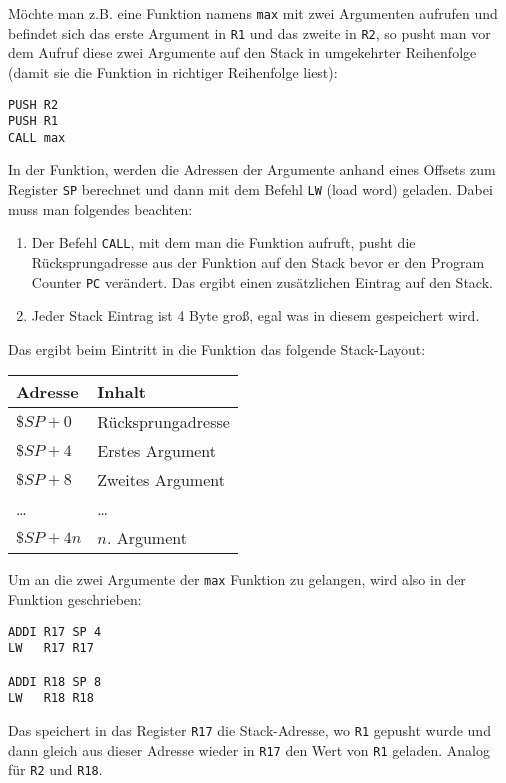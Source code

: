 Möchte man z.B. eine Funktion namens \texttt{max} mit zwei Argumenten aufrufen
und befindet sich das erste Argument in \texttt{R1} und das zweite in
\texttt{R2}, so pusht man vor dem Aufruf diese zwei Argumente auf den Stack in
umgekehrter Reihenfolge (damit sie die Funktion in richtiger Reihenfolge liest):
\begin{lstlisting}
PUSH R2
PUSH R1
CALL max
\end{lstlisting}
In der Funktion, werden die Adressen der Argumente anhand eines Offsets zum
Register \texttt{SP} berechnet und dann mit dem Befehl \texttt{LW} (load word)
geladen. Dabei muss man folgendes beachten:
\begin{enumerate}
 \item Der Befehl \texttt{CALL}, mit dem man die Funktion aufruft, pusht die
       Rücksprungadresse aus der Funktion auf den Stack bevor er den Program
       Counter \texttt{PC} verändert. Das ergibt einen zusätzlichen Eintrag 
       auf den Stack.
 \item Jeder Stack Eintrag ist 4 Byte groß, egal was in diesem gespeichert wird.
\end{enumerate}
Das ergibt beim Eintritt in die Funktion das folgende Stack-Layout:
\begin{center}
 \begin{tabular}{ll}
  Adresse     & Inhalt \\\hline
  $\$SP + 0$  & Rücksprungadresse \\
  $\$SP + 4$  & Erstes Argument   \\
  $\$SP + 8$  & Zweites Argument  \\
  \ldots      & \ldots            \\
  $\$SP + 4n$ & $n$. Argument
 \end{tabular}
\end{center}
Um an die zwei Argumente der \texttt{max} Funktion zu gelangen, wird also in der
Funktion geschrieben:
\begin{lstlisting}
ADDI R17 SP 4
LW   R17 R17

ADDI R18 SP 8
LW   R18 R18
\end{lstlisting}
Das speichert in das Register \texttt{R17} die Stack-Adresse, wo \texttt{R1}
gepusht wurde und dann gleich aus dieser Adresse wieder in \texttt{R17} den
Wert von \texttt{R1} geladen. Analog für \texttt{R2} und \texttt{R18}.


